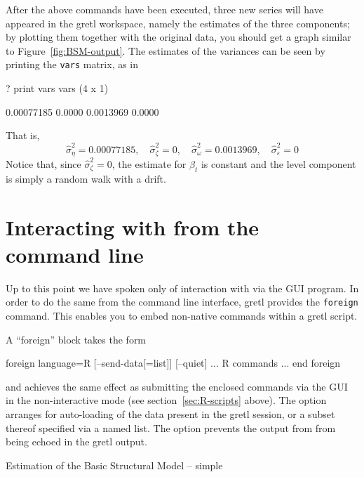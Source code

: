 After the above commands have been executed, three new series will
have appeared in the gretl workspace, namely the estimates of
the three components; by plotting them together with the original
data, you should get a graph similar to
Figure~\ref{fig:BSM-output}. The estimates of the variances can be
seen by printing the \texttt{vars} matrix, as in

\begin{code}
? print vars
vars (4 x 1)

  0.00077185 
      0.0000 
   0.0013969 
      0.0000 
\end{code}

That is,
\begin{equation*}
  \hat{\sigma}^2_{\eta} = 0.00077185, \quad
  \hat{\sigma}^2_{\zeta} = 0, \quad
  \hat{\sigma}^2_{\omega} = 0.0013969, \quad
  \hat{\sigma}^2_{\varepsilon} = 0
\end{equation*}
Notice that, since $\hat{\sigma}^2_{\zeta} = 0$, the estimate for
$\beta_t$ is constant and the level component is simply a random walk
with a drift.

\section{Interacting with  from the command line}
\label{sec:foreign-command}

Up to this point we have spoken only of interaction with  via
the GUI program. In order to do the same from the command line
interface, gretl provides the \texttt{foreign} command. This
enables you to embed non-native commands within a gretl
script.

A ``foreign'' block takes the form
\begin{code}
foreign language=R [--send-data[=list]] [--quiet]
    ... R commands ...
end foreign
\end{code}
and achieves the same effect as submitting the enclosed 
commands via the GUI in the non-interactive mode (see
section~\ref{sec:R-scripts} above). The  option
arranges for auto-loading of the data present in the gretl session, or
a subset thereof specified via a named list.  The 
option prevents the output from  from being echoed in the gretl
output.

\begin{script}[htbp]
  \caption{Estimation of the Basic Structural Model -- simple}
\label{RStructTS-simple}
\end{script}

